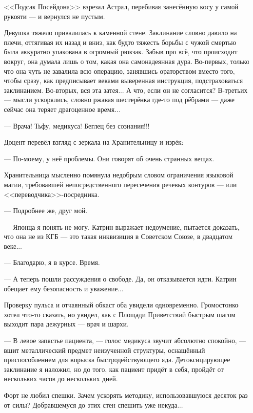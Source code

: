 \emptypar


<<Подсак Посейдона>> взрезал Астрал, перебивая занесённую косу у самой рукояти --- и вернулся не пустым.

Девушка тяжело привалилась к каменной стене.
Заклинание словно давило на плечи, оттягивая их назад и вниз,
как будто тяжесть борьбы с чужой смертью была аккуратно упакована в огромный рюкзак.
Забыв про всё, что происходит вокруг, она думала лишь о том, какая она самонадеянная дура.
Во-первых, только что она чуть не завалила всю операцию, занявшись ораторством вместо того, чтобы сразу,
как предписывает веками выверенная инструкция, подстраховаться заклинанием.
Во-вторых, вся эта затея... А что, если он не согласится?
В-третьих --- мысли ускорялись, словно ржавая шестерёнка где-то под рёбрами --- даже сейчас она теряет драгоценное время...

--- Врача! Тьфу, медикуса! Беглец без сознания!!!

\emptypar

Доцент перевёл взгляд с зеркала на Хранительницу и изрёк:

--- По-моему, у неё проблемы. Они говорят об очень странных вещах.

Хранительница мысленно помянула недобрым словом ограничения языковой магии,
требовавшей непосредственного пересечения речевых контуров --- или <<переводчика>>-посредника.

--- Подробнее же, друг мой.

--- Японца я понять не могу. Катрин выражает недоумение, пытается доказать,
что она не из КГБ --- это такая инквизиция в Советском Союзе, в двадцатом веке...

--- Благодарю, я в курсе. Время.

--- А теперь пошли рассуждения о свободе. Да, он отказывается идти. Катрин обещает ему безопасность и уважение...

Проверку пульса и отчаянный обкаст оба увидели одновременно.
Громостонко хотел что-то сказать, но увидел, как с Площади Приветствий быстрым шагом выходит пара дежурных --- врач и шархи.

\emptypar

--- В левое запястье пациента, --- голос медикуса звучит абсолютно спокойно,
--- вшит металлический предмет неизученной структуры, оснащённый приспособлением для впрыска быстродействующего яда.
Детоксицирующее заклинание я наложил, но до того, как пациент придёт в себя, пройдёт от нескольких часов до нескольких дней.

Форт не любил спешки. Зачем ускорять методику, использовавшуюся десяток раз от силы?
Добравшемуся до этих стен спешить уже некуда...

